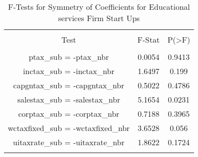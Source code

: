
\begin{table}[!htbp] \centering 
  \caption{F-Tests for Symmetry of Coefficients for Educational services Firm Start Ups} 
  \label{61Ftests} 
\begin{tabular}{@{\extracolsep{5pt}} ccc} 
\\[-1.8ex]\hline 
\hline \\[-1.8ex] 
Test & F-Stat & P(\textgreater F) \\ 
\hline \\[-1.8ex] 
ptax\_sub = -ptax\_nbr & 0.0054 & 0.9413 \\ 
inctax\_sub = -inctax\_nbr & 1.6497 & 0.199 \\ 
capgntax\_sub = -capgntax\_nbr & 0.5022 & 0.4786 \\ 
salestax\_sub = -salestax\_nbr & 5.1654 & 0.0231 \\ 
corptax\_sub = -corptax\_nbr & 0.7188 & 0.3965 \\ 
wctaxfixed\_sub = -wctaxfixed\_nbr & 3.6528 & 0.056 \\ 
uitaxrate\_sub = -uitaxrate\_nbr & 1.8622 & 0.1724 \\ 
\hline \\[-1.8ex] 
\end{tabular} 
\end{table} 
